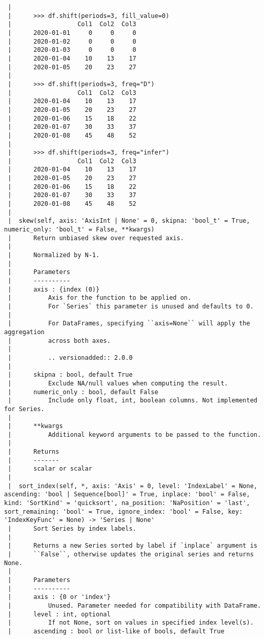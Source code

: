 \documentclass[
  letterpaper,
  DIV=11,
  numbers=noendperiod]{scrreprt}
\begin{document}
\begin{verbatim}
 |      
 |      >>> df.shift(periods=3, fill_value=0)
 |                  Col1  Col2  Col3
 |      2020-01-01     0     0     0
 |      2020-01-02     0     0     0
 |      2020-01-03     0     0     0
 |      2020-01-04    10    13    17
 |      2020-01-05    20    23    27
 |      
 |      >>> df.shift(periods=3, freq="D")
 |                  Col1  Col2  Col3
 |      2020-01-04    10    13    17
 |      2020-01-05    20    23    27
 |      2020-01-06    15    18    22
 |      2020-01-07    30    33    37
 |      2020-01-08    45    48    52
 |      
 |      >>> df.shift(periods=3, freq="infer")
 |                  Col1  Col2  Col3
 |      2020-01-04    10    13    17
 |      2020-01-05    20    23    27
 |      2020-01-06    15    18    22
 |      2020-01-07    30    33    37
 |      2020-01-08    45    48    52
 |  
 |  skew(self, axis: 'AxisInt | None' = 0, skipna: 'bool_t' = True, numeric_only: 'bool_t' = False, **kwargs)
 |      Return unbiased skew over requested axis.
 |      
 |      Normalized by N-1.
 |      
 |      Parameters
 |      ----------
 |      axis : {index (0)}
 |          Axis for the function to be applied on.
 |          For `Series` this parameter is unused and defaults to 0.
 |      
 |          For DataFrames, specifying ``axis=None`` will apply the aggregation
 |          across both axes.
 |      
 |          .. versionadded:: 2.0.0
 |      
 |      skipna : bool, default True
 |          Exclude NA/null values when computing the result.
 |      numeric_only : bool, default False
 |          Include only float, int, boolean columns. Not implemented for Series.
 |      
 |      **kwargs
 |          Additional keyword arguments to be passed to the function.
 |      
 |      Returns
 |      -------
 |      scalar or scalar
 |  
 |  sort_index(self, *, axis: 'Axis' = 0, level: 'IndexLabel' = None, ascending: 'bool | Sequence[bool]' = True, inplace: 'bool' = False, kind: 'SortKind' = 'quicksort', na_position: 'NaPosition' = 'last', sort_remaining: 'bool' = True, ignore_index: 'bool' = False, key: 'IndexKeyFunc' = None) -> 'Series | None'
 |      Sort Series by index labels.
 |      
 |      Returns a new Series sorted by label if `inplace` argument is
 |      ``False``, otherwise updates the original series and returns None.
 |      
 |      Parameters
 |      ----------
 |      axis : {0 or 'index'}
 |          Unused. Parameter needed for compatibility with DataFrame.
 |      level : int, optional
 |          If not None, sort on values in specified index level(s).
 |      ascending : bool or list-like of bools, default True

\end{verbatim}
\end{document}
